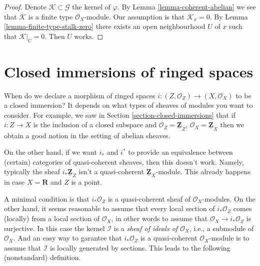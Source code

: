 \begin{proof}
Denote $\mathcal{K} \subset \mathcal{G}$ the kernel of $\varphi$.
By Lemma \ref{lemma-coherent-abelian} we see that $\mathcal{K}$ is
a finite type $\mathcal{O}_X$-module. Our assumption is that
$\mathcal{K}_x = 0$. By Lemma \ref{lemma-finite-type-stalk-zero}
there exists an open neighbourhood $U$ of $x$ such that $\mathcal{K}|_U = 0$. 
Then $U$ works.
\end{proof}













\section{Closed immersions of ringed spaces}
\label{section-closed-immersion}

\noindent
When do we declare a morphism of ringed spaces
$i : (Z, \mathcal{O}_Z) \to (X, \mathcal{O}_X)$
to be a closed immersion? It depends on what types of
sheaves of modules you want to consider.
For example, we saw in Section \ref{section-closed-immersions}
that if $i : Z \to X$ is the inclusion of a closed subspace
and $\mathcal{O}_Z = \underline{\mathbf{Z}}_Z$,
$\mathcal{O}_X = \underline{\mathbf{Z}}_X$ then we
obtain a good notion in the setting of abelian sheaves.

\medskip\noindent
On the other hand, if we want $i_*$ and $i^*$ to provide
an equivalence between (certain) categories of quasi-coherent
sheaves, then this doesn't work. Namely, typically the sheaf
$i_*\underline{\mathbf{Z}}_Z$ isn't a quasi-coherent
$\underline{\mathbf{Z}}_X$-module. This already happens
in case $X = \mathbf{R}$ and $Z$ is a point.

\medskip\noindent
A minimal condition is that $i_*\mathcal{O}_Z$ is a
quasi-coherent sheaf of $\mathcal{O}_X$-modules.
On the other hand, it seems reasonable to assume that
every local section of $i_*\mathcal{O}_Z$ comes (locally)
from a local section of $\mathcal{O}_X$, in other words
to assume that $\mathcal{O}_X \to i_*\mathcal{O}_Z$ is
surjective. In this case the kernel $\mathcal{I}$ is a
{\it sheaf of ideals of $\mathcal{O}_X$}, i.e., a submodule of $\mathcal{O}_X$.
And an easy way to garantee that $i_*\mathcal{O}_Z$ is a
quasi-coherent $\mathcal{O}_X$-module is to assume that
$\mathcal{I}$ is locally generated by sections. This leads to the following
(nonstandard) definition.

